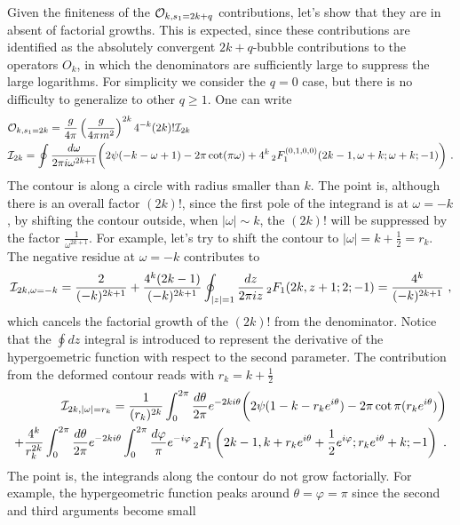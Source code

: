 \documentclass[a4paper,11pt]{article}
\begin{document}
Given the finiteness of the ${\cal O}_{k,s_1=2k+q}$ contributions, let's show that they are in absent of factorial growths. This is expected, since these contributions are identified as the absolutely convergent $2k+q$-bubble contributions to the operators $O_k$, in which the denominators are sufficiently large to suppress the large logarithms. For simplicity we consider the $q=0$ case, but there is no difficulty to generalize to other $q\ge 1$. One can write
\begin{align}
&{\cal O}_{k,s_1=2k}=\frac{g}{4\pi}\left(\frac{g}{4\pi m^2}\right)^{2k}4^{-k}(2k)!{\cal I}_{2k}\nonumber \\ 
&{\cal I}_{2k}= \oint \frac{d\omega}{2\pi  i\omega^{2k+1}}\bigg(2 \psi(-k-\omega+1)-2\pi  \cot (\pi  \omega)+4^k\,_2F_1^{(0,1,0,0)}(2k-1,\omega+k;\omega+k;-1)\bigg) \ .
\end{align}
The contour is along a circle with radius smaller than $k$.
The point is, although there is an overall factor $(2k)!$, since the first pole of the integrand is at $\omega=-k$, by shifting the contour outside, when $|\omega| \sim k$, the $(2k)!$ will be suppressed by the factor $\frac{1}{\omega^{2k+1}}$. For example, let's try to shift the contour to $|\omega|=k+\frac{1}{2}=r_k$. The negative residue at $\omega=-k$ contributes to 
\begin{align}
{\cal I}_{2k,\omega=-k}=\frac{2}{(-k)^{2k+1}}+\frac{4^k (2 k-1)}{(-k)^{2k+1}}\oint_{|z|=1}\frac{dz}{2\pi i z} \, _2F_1(2 k,z+1;2;-1)=\frac{4^k}{(-k)^{2k+1}} \ ,
\end{align}
which cancels the factorial growth of the $(2k)!$ from the denominator. Notice that the $\oint dz$ integral is introduced to represent the derivative of the hypergoemetric function with respect to the second parameter.  The contribution from the deformed contour reads with $r_k=k+\frac{1}{2}$
\begin{align}
{\cal I}_{2k,|\omega|=r_k}=\frac{1}{(r_k)^{2k}}\int_0^{2\pi} \frac{d\theta}{2\pi}e^{-2ki\theta} \bigg(2\psi(1-k-r_ke^{i\theta})-2\pi \cot\pi(r_ke^{i\theta})\bigg) \nonumber \\ 
+\frac{4^k}{r_k^{2k}}\int_{0}^{2\pi} \frac{d\theta}{2\pi}e^{-2ki\theta}\int_0^{2\pi} \frac{d\varphi}{\pi}e^{-i\varphi}\,_2F_1\left(2k-1,k+r_ke^{i\theta}+\frac{1}{2}e^{i\varphi};r_ke^{i\theta}+k;-1\right) \ .
\end{align}
The point is, the integrands along the contour do not grow factorially. For example, the hypergeometric function peaks around $\theta=\varphi=\pi$ since the second and third arguments become small
\end{document}
